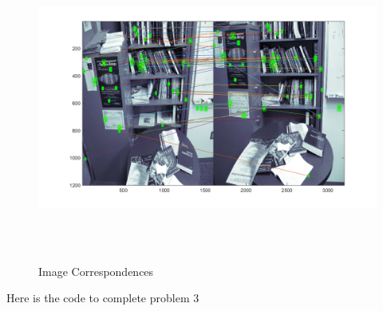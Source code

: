 \documentclass[11pt,psfig]{article}
\begin{document}
\begin{figure}[H]
\centering
\includegraphics[height=4in]{prob3matches.png}
\caption{Image Correspondences}
\label{p3}
\end{figure}
      
Here is the code to complete problem 3
     
        
\end{document}
